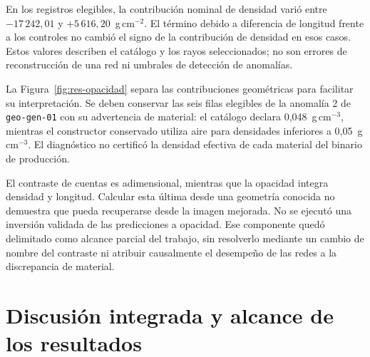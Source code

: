 En los registros elegibles, la contribución nominal de densidad varió entre $-17\,242{,}01$ y $+5\,616{,}20$~g\,cm$^{-2}$. El término debido a diferencia de longitud frente a los controles no cambió el signo de la contribución de densidad en esos casos. Estos valores describen el catálogo y los rayos seleccionados; no son errores de reconstrucción de una red ni umbrales de detección de anomalías.

La Figura~\ref{fig:res-opacidad} separa las contribuciones geométricas para facilitar su interpretación. Se deben conservar las seis filas elegibles de la anomalía 2 de \texttt{geo-gen-01} con su advertencia de material: el catálogo declara 0,048~g\,cm$^{-3}$, mientras el constructor conservado utiliza aire para densidades inferiores a 0,05~g\,cm$^{-3}$. El diagnóstico no certificó la densidad efectiva de cada material del binario de producción.

El contraste de cuentas es adimensional, mientras que la opacidad integra densidad y longitud. Calcular esta última desde una geometría conocida no demuestra que pueda recuperarse desde la imagen mejorada. No se ejecutó una inversión validada de las predicciones a opacidad. Ese componente quedó delimitado como alcance parcial del trabajo, sin resolverlo mediante un cambio de nombre del contraste ni atribuir causalmente el desempeño de las redes a la discrepancia de material.

\section{Discusión integrada y alcance de los resultados}\label{sec:res-discusion}
